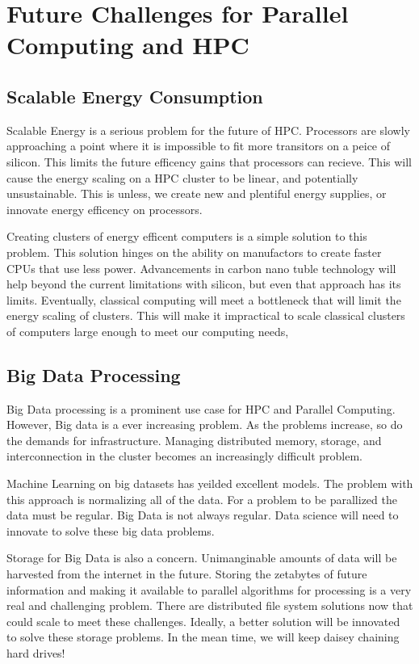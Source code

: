 \setlength{\parindent}{10ex}

\section{Future Challenges for Parallel Computing and HPC}

\subsection{Scalable Energy Consumption}
Scalable Energy is a serious problem for the future of HPC.
Processors are slowly approaching a point where it is impossible to fit more transitors on a peice of silicon.
This limits the future efficency gains that processors can recieve. 
This will cause the energy scaling on a HPC cluster to be linear, and potentially unsustainable.
This is unless, we create new and plentiful energy supplies, or innovate energy efficency on processors.

\par
Creating clusters of energy efficent computers is a simple solution to this problem.
This solution hinges on the ability on manufactors to create faster CPUs that use less power.
Advancements in carbon nano tuble technology will help beyond the current limitations with silicon, but even that approach has its limits.
Eventually, classical computing will meet a bottleneck that will limit the energy scaling of clusters.
This will make it impractical to scale classical clusters of computers large enough to meet our computing needs,

\subsection{Big Data Processing}
Big Data processing is a prominent use case for HPC and Parallel Computing. 
However, Big data is a ever increasing problem.
As the problems increase, so do the demands for infrastructure.
Managing distributed memory, storage, and interconnection in the cluster becomes an increasingly difficult problem.

\par
Machine Learning on big datasets has yeilded excellent models.
The problem with this approach is normalizing all of the data.
For a problem to be parallized the data must be regular.
Big Data is not always regular.
Data science will need to innovate to solve these big data problems.

\par 
Storage for Big Data is also a concern.
Unimanginable amounts of data will be harvested from the internet in the future.
Storing the zetabytes of future information and making it available to parallel algorithms for processing is a very real and challenging problem.
There are distributed file system solutions now that could scale to meet these challenges.
Ideally, a better solution will be innovated to solve these storage problems.
In the mean time, we will keep daisey chaining hard drives!

